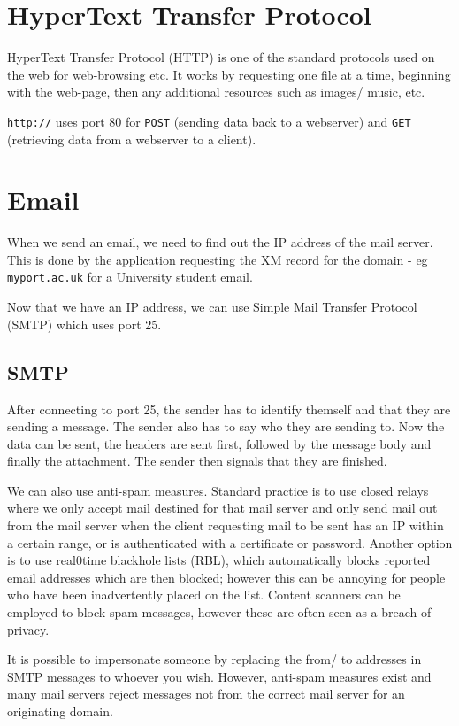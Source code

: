
\section{HyperText Transfer Protocol}
HyperText Transfer Protocol (HTTP) is one of the standard protocols used on the web for web-browsing etc. It works by requesting one file at a time, beginning with the web-page, then any additional resources such as images/ music, etc. 

\verb|http://| uses port 80 for \verb|POST| (sending data back to a webserver) and \verb|GET| (retrieving data from a webserver to a client). 

\section{Email}
When we send an email, we need to find out the IP address of the mail server. This is done by the application requesting the XM record for the domain - eg \verb|myport.ac.uk| for a University student email.

Now that we have an IP address, we can use Simple Mail Transfer Protocol (SMTP) which uses port 25. 
\subsection{SMTP}
After connecting to port 25, the sender has to identify themself and that they are sending a message. The sender also has to say who they are sending to. Now the data can be sent, the headers are sent first, followed by the message body and finally the attachment. The sender then signals that they are finished. 

We can also use anti-spam measures. Standard practice is to use closed relays where we only accept mail destined for that mail server and only send mail out from the mail server when the client requesting mail to be sent has an IP within a certain range, or is authenticated with a certificate or password. Another option is to use real0time blackhole lists (RBL), which automatically blocks reported email addresses which are then blocked; however this can be annoying for people who have been inadvertently placed on the list. Content scanners can be employed to block spam messages, however these are often seen as a breach of privacy.

It is possible to impersonate someone by replacing the from/ to addresses in SMTP messages to whoever you wish. However, anti-spam measures exist and many mail servers reject messages not from the correct mail server for an originating domain. 


